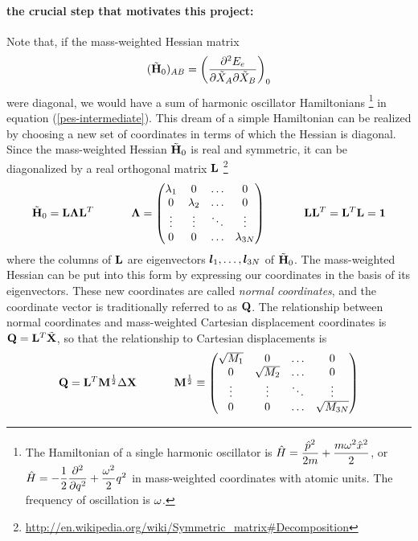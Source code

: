 \documentclass[11pt]{article}
\begin{document}
\paragraph{the crucial step that motivates this project:} Note that, if the
mass-weighted Hessian matrix
\begin{align}
    (\tilde{\mathbf{H}}_0)_{AB}
=
    \left(\dfrac{\partial^2 E_e}{\partial\tilde{X}_A\partial\tilde{X}_B}\right)_0
\end{align}
were diagonal, we would have a sum of harmonic oscillator Hamiltonians
\footnote{The Hamiltonian of a single harmonic oscillator is
$\hat{H}=\dfrac{\hat{p}^2}{2m}+\dfrac{m\omega^2\hat{x}^2}{2}$, or
$\hat{H}=-\dfrac{1}{2} \dfrac{ \partial^{2}  }{\partial q ^{2}}+\dfrac{\omega^2}{2}q^2$ in mass-weighted coordinates
with atomic units.  The frequency of oscillation is $\omega$.} in equation
(\ref{pes-intermediate}). This dream of a simple Hamiltonian can be realized by
choosing a new set of coordinates in terms of which the Hessian is diagonal.
Since the mass-weighted Hessian $\tilde{\mathbf{H}}_0$ is real and symmetric, it can
be diagonalized by a real orthogonal matrix $\mathbf{L}$
\footnote{\url{http://en.wikipedia.org/wiki/Symmetric_matrix\#Decomposition}}
\begin{align}
    \tilde{\mathbf{H}}_0
=
    \mathbf{L}\bm{\Lambda}\mathbf{L}^T
\ \ \ \ \ \ \ \ \ \ 
    \bm{\Lambda}
=
    \left(\begin{matrix} \lambda_1 &   0   &  \ldots  &   0      \\
           0   & \lambda_2 &  \ldots  &   0      \\
          \vdots  &  \vdots  &  \ddots  &  \vdots     \\
           0   &   0   &  \ldots  & \lambda_{3N} \end{matrix}\right)
\ \ \ \ \ \ \ \ \ \ 
    \mathbf{L}\mathbf{L}^T=\mathbf{L}^T\mathbf{L}=\mathbf{1}
\end{align}
where the columns of $\mathbf{L}$ are eigenvectors $\bm{l}_1,\ldots,\bm{l}_{3N}$ of
$\tilde{\mathbf{H}}_0$. The mass-weighted Hessian can be put into this form by
expressing our coordinates in the basis of its eigenvectors. These new
coordinates are called {\it normal coordinates}, and the coordinate vector is
traditionally referred to as $\mathbf{Q}$. The relationship between normal
coordinates and mass-weighted Cartesian displacement coordinates is
$\mathbf{Q}=\mathbf{L}^T\tilde{\mathbf{X}}$, so that the relationship to Cartesian
displacements is
\begin{align}
\label{q-to-dx}
    \mathbf{Q}
=
    \mathbf{L}^T
    \mathbf{M}^{\frac{1}{2}}
    \Delta\mathbf{X}
\ \ \ \ \ \ \ \ \ \ 
    \mathbf{M}^{\frac{1}{2}}
\equiv
    \left(\begin{matrix} \sqrt{M_1} &     0      &   \ldots  &     0         \\
             0      & \sqrt{M_2} &   \ldots  &     0         \\
            \vdots     &    \vdots     &   \ddots  &    \vdots        \\
             0      &     0      &   \ldots  & \sqrt{M_{3N}} \end{matrix}\right)
\end{align}
\end{document}

